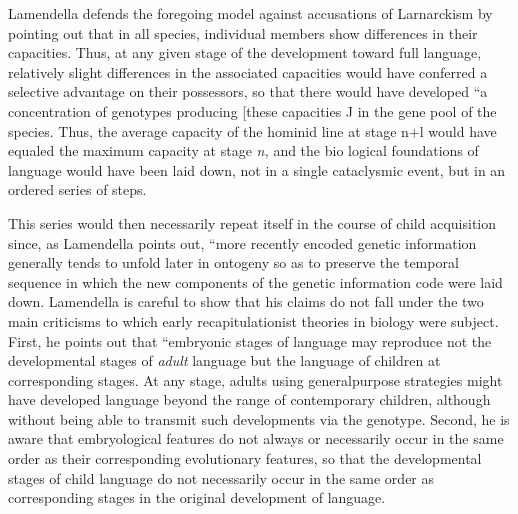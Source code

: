 Lamendella defends the foregoing model against accusations of Larnarckism by pointing out that in all species, individual members show differences in their capacities. Thus, at any given stage of the development toward full language, relatively slight differences in the associated capacities would have conferred a selective advantage on their possessors, so that there would have developed ``a concentration
of genotypes producing [these capacities J in the gene pool of the species. Thus, the average capacity of the hominid line at stage n+l would have equaled the maximum capacity at stage \textit{n,} and the bio%
logical foundations of language would have been laid down, not in a single cataclysmic event, but in an ordered series of steps.

This series would then necessarily repeat itself in the course of child acquisition since, as Lamendella points out, ``more recently en\-coded genetic information generally tends to unfold later in ontogeny so as to preserve the temporal sequence in which the new components of the genetic information code were laid down. Lamendella is careful to show that his claims do not fall under the two main criticisms to which early recapitulationist theories in biology were subject. First, he points out that ``embryonic stages of language may reproduce not the developmental stages of \textit{adult} language but the language of children at corresponding stages. At any stage, adults using general\-purpose strategies might have developed language beyond the range of contemporary children, although without being able to transmit such developments via the genotype. Second, he is aware that embryological features do not always or necessarily occur in the same order as their corresponding evolutionary features, so that the developmental stages of child language do not necessarily occur in the same order as corre\-sponding stages in the original development of language.


